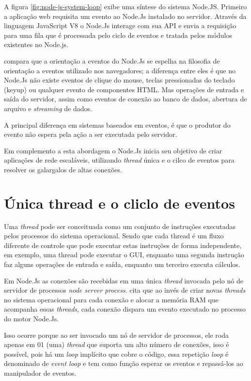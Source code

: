   A figura \ref{fig:node-js-system-loop} exibe uma síntese do sistema Node.JS. Primeiro a aplicação web requisita um evento 
  ao Node.Js instalado no servidor. Através da linguagem JavaScript V8 o Node.Js interage com sua \ac{API} e envia 
  a requisição para uma fila que é processada pelo ciclo de eventos e tratada pelos módulos existentes no Node.js. 
  
   compara que a orientação a eventos do Node.Js se espelha na filosofia de orientação 
  a eventos utilizado nos navegadores; a diferença entre eles é que no Node.Js 
  não existe eventos de clique do mouse, teclas pressionadas do teclado (keyup) ou qualquer evento de componentes HTML. Mas operações
  de entrada e saída do servidor, assim como eventos de conexão ao banco de dados, abertura de arquivo e \textit{streaming}
  de dados.
  
  A principal diferença em sistemas baseados em eventos, é que o produtor do evento não espera pela ação a ser executada
  pelo servidor. \cite{Junior:2012}    

  Em complemento a esta abordagem o Node.Js inicia seu objetivo de criar aplicações de rede escaláveis, utilizando \textit{thread} única
  e o cilco de eventos para resolver os galargalos de altas conexões.

\section{Única thread e o cliclo de eventos}
\label{single-thread}

  Uma \textit{thread} pode ser conceituada como um conjunto de instruções executadas pelos processos do sistema operacional.
  Sendo que cada thread é um fluxo diferente de controle que pode executar estas instruções de forma independente, em exemplo,
  uma thread pode executar o GUI, enquanto uma segunda instrução faz alguns operações de entrada e saída, 
  enquanto um terceiro executa cálculos. \cite{Lewis:1995}
  
  Em Node.Js as conexões são recebidas em uma única \textit{thread} invocada pelo nó de servidor de processos \textit{node server process}.
   cita que ao invés de criar novas \textit{threads}
  no sistema operacional para cada conexão e alocar a memória RAM que acompanha essas \textit{threads}, 
  cada conexão dispara um evento executado no processo do motor Node.Js.
  
  Isso ocorre porque ao ser invocado um nó de servidor de processos, ele roda apenas em 01 (uma) 
  \textit{thread} que suporta um alto número de conexões, isso é possível, pois há um \textit{loop} implícito que cobre o código, 
  essa repetição \textit{loop} é denominado de \textit{event loop} e tem como função esperar os eventos e repassá-los 
  ao manipulador de eventos. \cite{Tilkov:2010}
  
